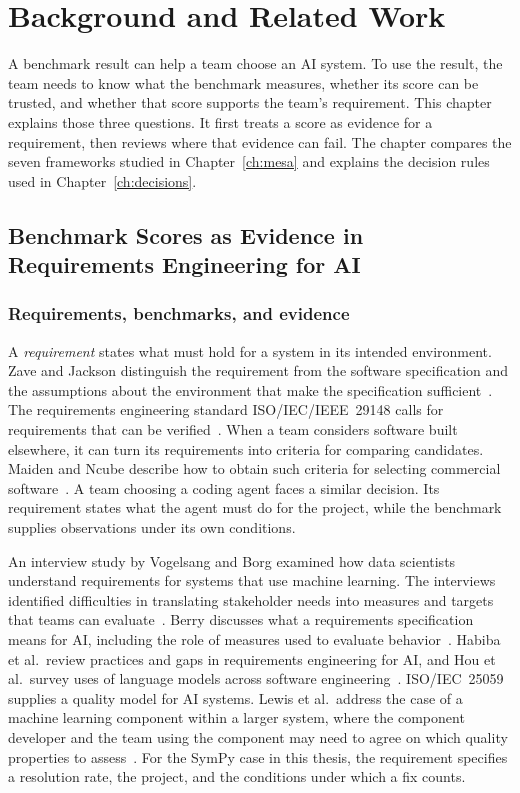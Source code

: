 \chapter{Background and Related Work}
\label{ch:background}

A benchmark result can help a team choose an AI system. To use the result, the team needs to know what the benchmark measures, whether its score can be trusted, and whether that score supports the team's requirement. This chapter explains those three questions. It first treats a score as evidence for a requirement, then reviews where that evidence can fail. The chapter compares the seven frameworks studied in Chapter~\ref{ch:mesa} and explains the decision rules used in Chapter~\ref{ch:decisions}.

\section{Benchmark Scores as Evidence in Requirements Engineering for AI}
\label{sec:bg_re_evidence}

\subsection{Requirements, benchmarks, and evidence}

A \emph{requirement} states what must hold for a system in its intended environment. Zave and Jackson distinguish the requirement from the software specification and the assumptions about the environment that make the specification sufficient~\cite{zave_jackson_1997}. The requirements engineering standard ISO/IEC/IEEE~29148 calls for requirements that can be verified~\cite{iso_iec_ieee_29148_2018}. When a team considers software built elsewhere, it can turn its requirements into criteria for comparing candidates. Maiden and Ncube describe how to obtain such criteria for selecting commercial software~\cite{maiden_ncube_cots_1998}. A team choosing a coding agent faces a similar decision. Its requirement states what the agent must do for the project, while the benchmark supplies observations under its own conditions.

An interview study by Vogelsang and Borg examined how data scientists understand requirements for systems that use machine learning. The interviews identified difficulties in translating stakeholder needs into measures and targets that teams can evaluate~\cite{vogelsang_borg_re4ml_2019}. Berry discusses what a requirements specification means for AI, including the role of measures used to evaluate behavior~\cite{berry_re4ai_2022}. Habiba et al.\ review practices and gaps in requirements engineering for AI, and Hou et al.\ survey uses of language models across software engineering~\cite{habiba_re4ai_maturity_2024,hou_llm4se_survey_2024}. ISO/IEC~25059 supplies a quality model for AI systems. Lewis et al.\ address the case of a machine learning component within a larger system, where the component developer and the team using the component may need to agree on which quality properties to assess~\cite{iso_iec_25059_2023,lewis_quality_model_ml_2026}. For the SymPy case in this thesis, the requirement specifies a resolution rate, the project, and the conditions under which a fix counts.

